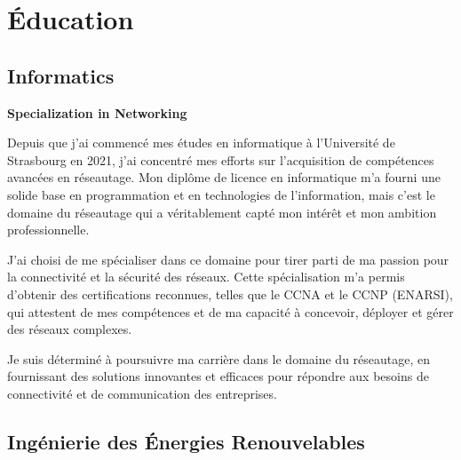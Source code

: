 \documentclass{article}
\begin{document}
\section{Éducation}
    \subsection{Informatics}
    
    \par
    \par\textbf{Specialization in Networking}

    Depuis que j'ai commencé mes études en informatique à l'Université de Strasbourg en 2021, j'ai concentré mes efforts sur l'acquisition de compétences avancées en réseautage. Mon diplôme de licence en informatique m'a fourni une solide base en programmation et en technologies de l'information, mais c'est le domaine du réseautage qui a véritablement capté mon intérêt et mon ambition professionnelle.

    J'ai choisi de me spécialiser dans ce domaine pour tirer parti de ma passion pour la connectivité et la sécurité des réseaux. Cette spécialisation m'a permis d'obtenir des certifications reconnues, telles que le CCNA et le CCNP (ENARSI), qui attestent de mes compétences et de ma capacité à concevoir, déployer et gérer des réseaux complexes.

    Je suis déterminé à poursuivre ma carrière dans le domaine du réseautage, en fournissant des solutions innovantes et efficaces pour répondre aux besoins de connectivité et de communication des entreprises.
    
    
    \newpage

    \subsection{Ingénierie des Énergies Renouvelables}
\end{document}
